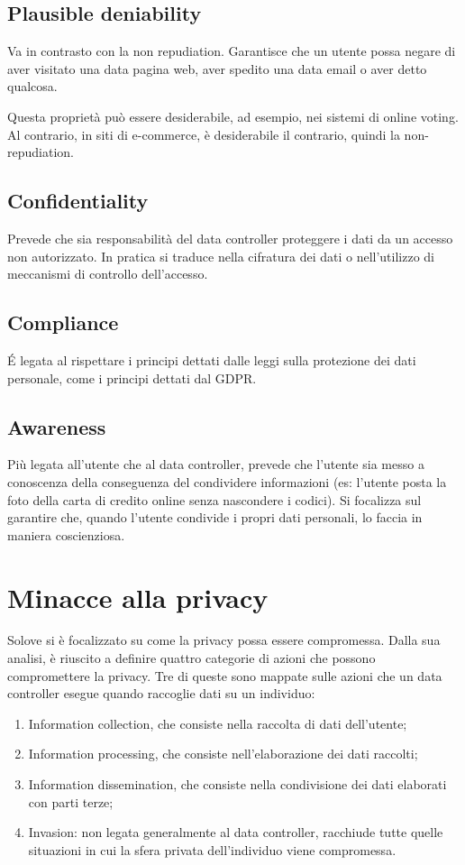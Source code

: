 \subsection{Plausible deniability}
Va in contrasto con la non repudiation. Garantisce che un utente possa negare di aver visitato una data pagina web, aver spedito una data email o aver detto qualcosa. 

Questa proprietà può essere desiderabile, ad esempio, nei sistemi di online voting. Al contrario, in siti di e-commerce, è desiderabile il contrario, quindi la non-repudiation.

\subsection{Confidentiality}
Prevede che sia responsabilità del data controller proteggere i dati da un accesso non autorizzato. In pratica si traduce nella cifratura dei dati o nell'utilizzo di meccanismi di controllo dell'accesso.

\subsection{Compliance}
É legata al rispettare i principi dettati dalle leggi sulla protezione dei dati personale, come i principi dettati dal GDPR.

\subsection{Awareness}
Più legata all'utente che al data controller, prevede che l'utente sia messo a conoscenza della conseguenza del condividere informazioni (es: l'utente posta la foto della carta di credito online senza nascondere i codici). Si focalizza sul garantire che, quando l'utente condivide i propri dati personali, lo faccia in maniera coscienziosa. 

\section{Minacce alla privacy}
Solove si è focalizzato su come la privacy possa essere compromessa. Dalla sua analisi, è riuscito a definire quattro categorie di azioni che possono compromettere la privacy. Tre di queste sono mappate sulle azioni che un data controller esegue quando raccoglie dati su un individuo:
\begin{enumerate}
    \item Information collection, che consiste nella raccolta di dati dell'utente;
    \item Information processing, che consiste nell'elaborazione dei dati raccolti;
    \item Information dissemination, che consiste nella condivisione dei dati elaborati con parti terze;
    \item Invasion: non legata generalmente al data controller, racchiude tutte quelle situazioni in cui la sfera privata dell'individuo viene compromessa.
\end{enumerate}

